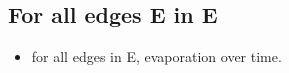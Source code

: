 \subsection{For all edges E in E}
\begin{itemize}
\item for all edges in E, evaporation over time. 
\end{itemize}




